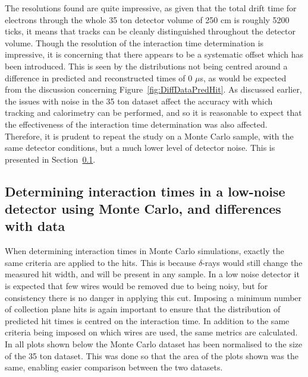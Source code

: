 The resolutions found are quite impressive, as given that the total drift time for electrons through the whole 35 ton detector volume of 250 cm is roughly 5200 ticks, it means that tracks can be cleanly distinguished throughout the detector volume. Though the resolution of the interaction time determination is impressive, it is concerning that there appears to be a systematic offset which has been introduced. This is seen by the distributions not being centred around a difference in predicted and reconstructed times of 0 $\mu$s, as would be expected from the discussion concerning Figure~\ref{fig:DiffDataPredHit}. As discussed earlier, the issues with noise in the 35 ton dataset affect the accuracy with which tracking and calorimetry can be performed, and so it is reasonable to expect that the effectiveness of the interaction time determination was also affected. Therefore, it is prudent to repeat the study on a Monte Carlo sample, with the same detector conditions, but a much lower level of detector noise. This is presented in Section~\ref{sec:MCDataComp}. \\

\subsection{Determining interaction times in a low-noise detector using Monte Carlo, and differences with data} \label{sec:MCDataComp}
When determining interaction times in Monte Carlo simulations, exactly the same criteria are applied to the hits. This is because $\delta$-rays would still change the measured hit width, and will be present in any sample. In a low noise detector it is expected that few wires would be removed due to being noisy, but for consistency there is no danger in applying this cut. Imposing a minimum number of collection plane hits is again important to ensure that the distribution of predicted hit times is centred on the interaction time. In addition to the same criteria being imposed on which wires are used, the same metrics are calculated. In all plots shown below the Monte Carlo dataset has been normalised to the size of the 35 ton dataset. This was done so that the area of the plots shown was the same, enabling easier comparison between the two datasets. \\


